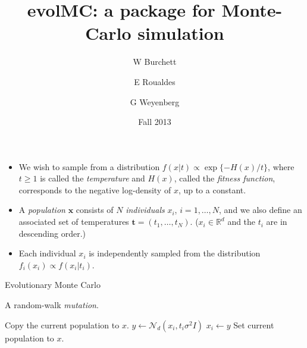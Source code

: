 \documentclass{beamer}
\title{evolMC: a package for Monte-Carlo simulation}
\author{W Burchett \and E Roualdes \and G Weyenberg}
\date{Fall 2013}
\newcommand{\bt}{\mathbf t}
\begin{document}
\begin{frame}
\maketitle
\end{frame}

\begin{frame}
  \begin{itemize}
  \item We wish to sample from a distribution $f(x|t) \propto \exp\{
    -H(x)/t \}$, where $t\ge 1$ is called the \emph{temperature} and
    $H(x)$, called the \emph{fitness function}, corresponds to the
    negative log-density of $x$, up to a constant.
  \item A \emph{population}
    $\mathbf{x}$ consists of $N$ \emph{individuals} $x_i$, $i = 1,
    \ldots, N$, and we also define an associated set of temperatures
    $\bt = (t_1,\ldots,t_N)$. ($x_i \in \mathbb{R}^d$ and the $t_i$
    are in descending order.)
  \item Each individual $x_i$ is independently
    sampled from the distribution $f_i(x_i) \propto f(x_i|t_i)$.
  \end{itemize}
\end{frame}

\begin{frame}
\begin{algorithm}[H]
\caption{Evolutionary Monte Carlo}
  \label{alg:emc}
  \footnotesize
  \begin{algorithmic}
     
    \State {}
    \Ow 
    \State {}
    \EndWp
    \State  {}
    \EndProcedure
  \end{algorithmic}
\end{algorithm}
\end{frame}

 \begin{frame}
 \begin{algorithm}[H]
   \caption{A random-walk {\it mutation}.}
   \label{alg:mutate}
   \footnotesize
   \begin{algorithmic}
     \State Copy the current population to $x$.
     \State $y \gets \mathcal N_d(x_i,t_i \sigma^2I)$
     \State $x_i \gets y$
     \EndWp
     \EndFor
     \State Set current population to $x$.
     \EndProcedure
   \end{algorithmic}
 \end{algorithm}
 \end{frame}
\end{document}
